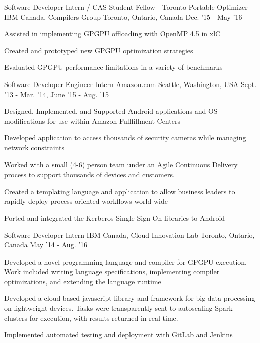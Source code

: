 \begin{cventries}
\cventry
    {Software Developer Intern / CAS Student Fellow - Toronto Portable Optimizer} %
    {IBM Canada, Compilers Group} %
    {Toronto, Ontario, Canada} %
    {Dec. '15 - May '16} %
    {
        \begin{cvitems}
            \item Assisted in implementing GPGPU offloading with OpenMP 4.5 in xlC
            \item Created and prototyped new GPGPU optimization strategies
            \item Evaluated GPGPU performance limitations in a variety of benchmarks
        \end{cvitems}
    }
\cventry
    {Software Developer Engineer Intern} %
    {Amazon.com} %
    {Seattle, Washington, USA} %
    {Sept. '13 - Mar. '14,
    June '15 - Aug. '15} %
    {
        \begin{cvitems}
            \item Designed, Implemented, and Supported Android applications and OS modifications for use within Amazon Fullfillment Centers
            \item Developed application to access thousands of security cameras while managing network constraints
            \item Worked with a small (4-6) person team under an Agile Continuous Delivery process to support thousands of devices and customers.
            \item Created a templating language and application to allow business leaders to rapidly deploy process-oriented workflows world-wide
            \item Ported and integrated the Kerberos Single-Sign-On libraries to Android
        \end{cvitems}
    }
\cventry
    {Software Developer Intern} %
    {IBM Canada, Cloud Innovation Lab} %
    {Toronto, Ontario, Canada} %
    {May '14 - Aug. '16} %
    {
        \begin{cvitems}
            \item Developed a novel programming language and compiler for GPGPU execution. Work included writing language specifications, implementing compiler optimizations, and extending the language runtime
            \item Developed a cloud-based javascript library and framework for big-data processing on lightweight devices. Tasks were transparently sent to autoscaling Spark clusters for execution, with results returned in real-time.
            \item Implemented automated testing and deployment with GitLab and Jenkins
        \end{cvitems}
    }
\end{cventries}
